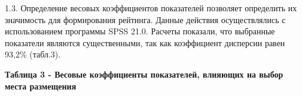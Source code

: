 1.3. Определение весовых коэффициентов показателей позволяет определить
их значимость для формирования рейтинга. Данные действия осуществлялись
с использованием программы SPSS 21.0. Расчеты показали, что выбранные
показатели являются существенными, так как коэффициент дисперсии равен
93,2\% (табл.3).

{\bfseries Таблица 3 - Весовые коэффициенты показателей, влияющих на выбор
места размещения}

